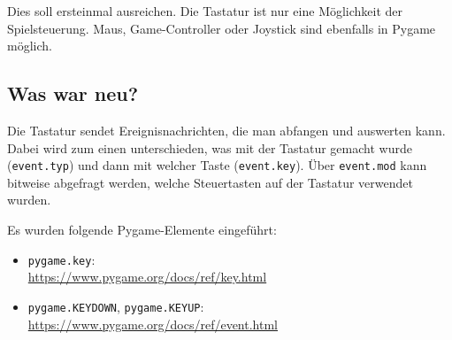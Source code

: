 Dies soll ersteinmal ausreichen. Die Tastatur ist nur eine Möglichkeit der Spielsteuerung. Maus, Game-Controller oder Joystick sind ebenfalls in Pygame möglich.

\subsection*{Was war neu?}
Die Tastatur sendet Ereignisnachrichten, die man abfangen und auswerten kann. Dabei wird zum einen unterschieden, was mit der Tastatur gemacht wurde (\texttt{event.typ}) und dann mit welcher Taste (\texttt{event.key}). Über \texttt{event.mod} kann bitweise abgefragt werden, welche Steuertasten auf der Tastatur verwendet wurden.

Es wurden folgende Pygame-Elemente eingeführt:


\begin{itemize}
	\item \texttt{pygame.key}:
	\\ \url{https://www.pygame.org/docs/ref/key.html}

	\item \texttt{pygame.KEYDOWN}, \texttt{pygame.KEYUP}:
	\\ \url{https://www.pygame.org/docs/ref/event.html}
	
\end{itemize}


